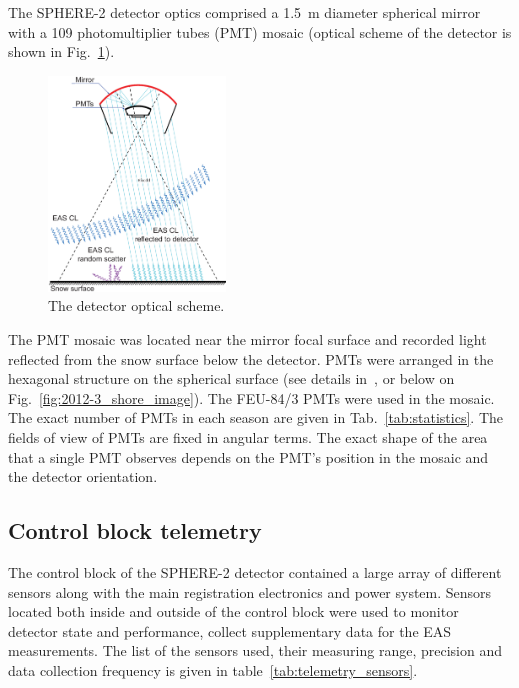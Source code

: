 \documentclass[final,5p,times,twocolumn]{elsarticle}
\begin{document}
The \mbox{SPHERE-2} detector optics comprised a 1.5~m diameter spherical mirror with a 109 photomultiplier tubes (PMT) mosaic (optical scheme of the detector is shown in Fig.~\ref{fig:optics}).

\begin{figure}[bt]
\centering
    \includegraphics[width=0.42\textwidth]{optics.eps}
    \caption{The detector optical scheme.}
\label{fig:optics}
\end{figure}

The PMT mosaic was located near the mirror focal surface and recorded light reflected from the snow surface below the detector. PMTs were arranged in the hexagonal structure on the spherical surface (see details in~\cite{Ant20}, or below on Fig.~\ref{fig:2012-3_shore_image}). The FEU-84/3 PMTs were used in the mosaic. The exact number of PMTs in each season are given in Tab.~\ref{tab:statistics}. The fields of view of PMTs are fixed in angular terms. The exact shape of the area that a single PMT observes depends on the PMT's position in the mosaic and the detector orientation.

\subsection{Control block telemetry}

The control block of the SPHERE-2 detector contained a large array of different sensors along with the main registration electronics and power system. Sensors located both inside and outside of the control block were used to monitor detector state and performance, collect supplementary data for the EAS measurements. The list of the sensors used, their measuring range, precision and data collection frequency is given in table~\ref{tab:telemetry_sensors}. 
\end{document}
